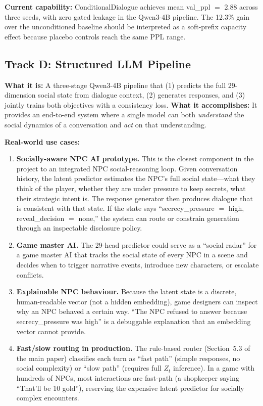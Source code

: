 \documentclass[11pt]{article}
\begin{document}
\textbf{Current capability:} ConditionalDialogue achieves mean val\_ppl $=$ 2.88 across three seeds, with zero gated leakage in the Qwen3-4B pipeline.
The 12.3\% gain over the unconditioned baseline should be interpreted as a soft-prefix capacity effect because placebo controls reach the same PPL range.

\subsection{Track D: Structured LLM Pipeline}

\textbf{What it is:} A three-stage Qwen3-4B pipeline that (1) predicts the full 29-dimension social state from dialogue context, (2) generates responses, and (3) jointly trains both objectives with a consistency loss.
\textbf{What it accomplishes:} It provides an end-to-end system where a single model can both \textit{understand} the social dynamics of a conversation and \textit{act} on that understanding.

\textbf{Real-world use cases:}
\begin{enumerate}
    \item \textbf{Socially-aware NPC AI prototype.} This is the closest component in the project to an integrated NPC social-reasoning loop.
    Given conversation history, the latent predictor estimates the NPC's full social state---what they think of the player, whether they are under pressure to keep secrets, what their strategic intent is.
    The response generator then produces dialogue that is consistent with that state.
    If the state says ``secrecy\_pressure $=$ high, reveal\_decision $=$ none,'' the system can route or constrain generation through an inspectable disclosure policy.
    \item \textbf{Game master AI.} The 29-head predictor could serve as a ``social radar'' for a game master AI that tracks the social state of every NPC in a scene and decides when to trigger narrative events, introduce new characters, or escalate conflicts.
    \item \textbf{Explainable NPC behaviour.} Because the latent state is a discrete, human-readable vector (not a hidden embedding), game designers can inspect why an NPC behaved a certain way.
    ``The NPC refused to answer because secrecy\_pressure was high'' is a debuggable explanation that an embedding vector cannot provide.
    \item \textbf{Fast/slow routing in production.} The rule-based router (Section~5.3 of the main paper) classifies each turn as ``fast path'' (simple responses, no social complexity) or ``slow path'' (requires full $Z_t$ inference).
    In a game with hundreds of NPCs, most interactions are fast-path (a shopkeeper saying ``That'll be 10 gold''), reserving the expensive latent predictor for socially complex encounters.
\end{enumerate}
\end{document}
